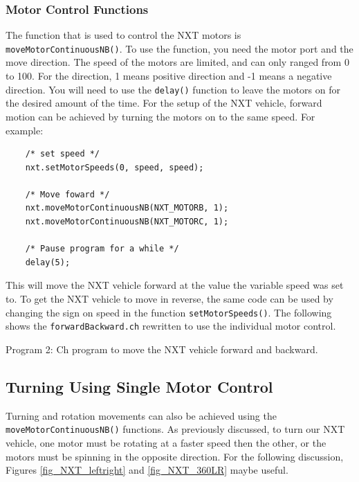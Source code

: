 \subsubsection{Motor Control Functions}
The function that is used to control the NXT motors is 
\verb+moveMotorContinuousNB()+. To use the function, you need the
motor port and the move direction. The speed of the motors are 
limited, and can only ranged from 0 to 100. For the direction, 1 
means positive direction and -1 means a negative direction. You 
will need to use the \verb+delay()+ function to leave the motors 
on for the desired amount of the time. For the setup of the NXT 
vehicle, forward motion can be achieved by turning the motors on 
to the same speed. For example:
\begin{verbatim}
    /* set speed */
    nxt.setMotorSpeeds(0, speed, speed);

    /* Move foward */
    nxt.moveMotorContinuousNB(NXT_MOTORB, 1);
    nxt.moveMotorContinuousNB(NXT_MOTORC, 1);

    /* Pause program for a while */
    delay(5);
\end{verbatim}
\noindent
This will move the NXT vehicle forward at the value the variable speed was set to. To get the 
NXT vehicle to move in reverse, the same code can be used by changing the sign on speed in the 
function \verb+setMotorSpeeds()+. The following shows the \verb+forwardBackward.ch+ rewritten to use 
the individual motor control.


\begin{center}
Program 2: Ch program to move the NXT vehicle forward and backward.
\end{center}

\subsection{Turning Using Single Motor Control}
Turning and rotation movements can also be achieved using the \verb+moveMotorContinuousNB()+ 
functions. As previously discussed, to turn our NXT vehicle, one motor must be rotating at a faster speed then the other, 
or the motors must be spinning in the opposite direction. For the following discussion, Figures \ref{fig_NXT_leftright} 
and \ref{fig_NXT_360LR} maybe useful.\\

